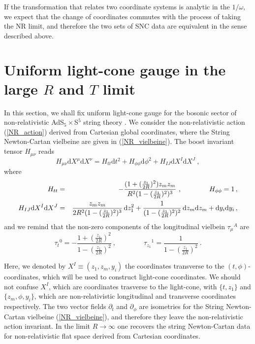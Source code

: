 \documentclass[12pt]{article}
\def\dd{\text{d}}
\numberwithin{equation}{section}
\begin{document}
If the transformation that relates two coordinate systems is analytic in the $1/\omega$, we expect that the change of coordinates commutes with the process of taking the NR limit, and therefore the two sets of SNC data are equivalent in the sense described above.





\section{Uniform light-cone gauge in the large $R$ and $T$ limit}
\label{sec:lighcone}
In this section, we shall fix uniform light-cone gauge for the bosonic sector of non-relativistic AdS$_5\times$S$^5$ string theory \cite{Gomis:2005pg}. We consider the non-relativistic action (\ref{NR_action}) derived from Cartesian global coordinates, where the String Newton-Cartan vielbeine are given in (\ref{NR_vielbeine}).  The boost invariant tensor $H_{\mu\nu}$ reads
\begin{equation}
H_{\mu\nu} \dd X^{\mu} \dd X^{\nu} =  H_{tt} \dd t^2 + H_{\phi\phi} \dd \phi^2 + H_{IJ} \dd X^I \dd X^J \ , 
\end{equation}
where
\begin{eqnarray}
\notag
H_{tt} &=& - \frac{(1+ (\frac{z_1}{2 R})^2)z_m z_m}{R^2(1- (\frac{z_1}{2 R})^2)^3} \ , \qquad\qquad
H_{\phi\phi} = 1 \, , \\
H_{IJ} \dd X^I \dd X^J &=&  \frac{z_m z_m}{2 R^2(1- (\frac{z_1}{2 R})^2)^3}\,  \dd z_1^2 
+ \frac{1}{(1- (\frac{z_1}{2 R})^2)^2} \, \dd z_m \dd z_m 
+ \dd y_i \dd y_i \, ,
\end{eqnarray}
and we remind that the non-zero components of the longitudinal vielbein $\tau_{\mu}{}^A$ are
\begin{equation}
\tau_t{}^0 = -\frac{1+ (\frac{z_1}{2R})^2}{1- (\frac{z_1}{2R})^2} \ , \qquad\qquad
\tau_{z_1}{}^1 =\frac{1}{1 - (\frac{z_1}{2R})^2} \ . \label{tauvielbein}
\end{equation}

Here, we denoted by $X^I \equiv (z_1, z_m,  y_i)$ the coordinates transverse to the $(t, \phi)$-coordinates, which will be used to construct light-cone coordinates. We should not confuse $X^I$, which are coordinates trasverse to the light-cone, with $\{ t, z_1 \}$ and $\{ z_m, \phi, y_i \}$, which are non-relativistic longitudinal and transverse coordinates respectively. The two vector fields $\partial_t$ and $\partial_{\phi}$ are isometries for the String Newton-Cartan vielbeine (\ref{NR_vielbeine}), and therefore they leave the non-relativistic action invariant. In the limit $R\rightarrow \infty$ one recovers the string Newton-Cartan data for non-relativistic flat space derived from Cartesian coordinates. 
\end{document}
